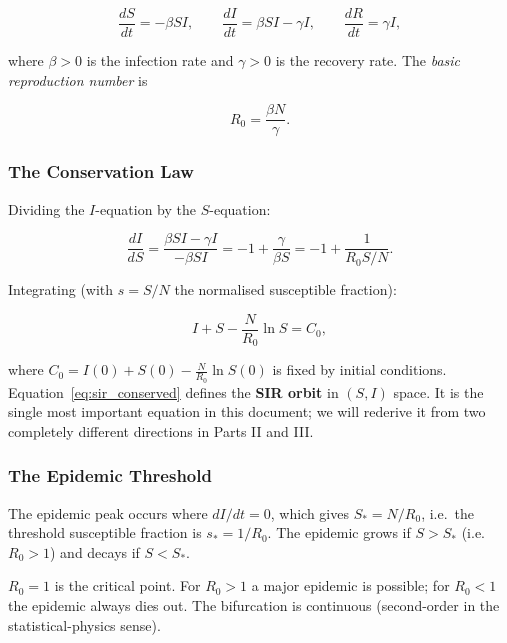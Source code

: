 \documentclass[11pt,a4paper]{article}
\theoremstyle{definition}
\begin{document}
\begin{equation}
  \frac{dS}{dt} = -\beta SI, \qquad
  \frac{dI}{dt} = \beta SI - \gamma I, \qquad
  \frac{dR}{dt} = \gamma I,
  \label{eq:sir_ode}
\end{equation}

where $\beta > 0$ is the infection rate and $\gamma > 0$ is the recovery rate.
The \emph{basic reproduction number} is

\begin{equation}
  R_0 = \frac{\beta N}{\gamma}.
  \label{eq:R0}
\end{equation}

\subsubsection{The Conservation Law}

Dividing the $I$-equation by the $S$-equation:

\[
  \frac{dI}{dS} = \frac{\beta SI - \gamma I}{-\beta SI} = -1 + \frac{\gamma}{\beta S}
  = -1 + \frac{1}{R_0 S/N}.
\]

Integrating (with $s = S/N$ the normalised susceptible fraction):

\begin{equation}
  \boxed{ I + S - \frac{N}{R_0}\ln S = C_0, }
  \label{eq:sir_conserved}
\end{equation}

where $C_0 = I(0) + S(0) - \frac{N}{R_0}\ln S(0)$ is fixed by initial conditions.
Equation~\eqref{eq:sir_conserved} defines the \textbf{SIR orbit} in $(S,I)$ space.
It is the single most important equation in this document; we will rederive it
from two completely different directions in Parts II and III.

\subsubsection{The Epidemic Threshold}

The epidemic peak occurs where $dI/dt = 0$, which gives $S_* = N/R_0$, i.e.\ the
threshold susceptible fraction is $s_* = 1/R_0$. The epidemic grows if $S > S_*$
(i.e.\ $R_0 > 1$) and decays if $S < S_*$.

\begin{keybox}
$R_0 = 1$ is the critical point. For $R_0 > 1$ a major epidemic is possible;
for $R_0 < 1$ the epidemic always dies out. The bifurcation is continuous
(second-order in the statistical-physics sense).
\end{keybox}
\end{document}
